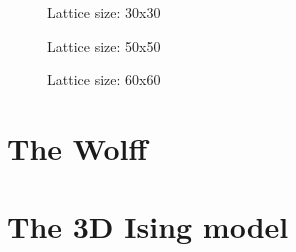 \documentclass[11pt,a4paper]{article}
\begin{document}
\begin{figure}[h!]

  \caption{Lattice size: 30x30}

\end{figure}


\begin{figure}[h!]

  \caption{Lattice size: 50x50}

\end{figure}


\begin{figure}[h!]

  \caption{Lattice size: 60x60}

\label{fig:meto_60}
\end{figure}



\section{The Wolff}

\section{The 3D Ising model}
\end{document}
